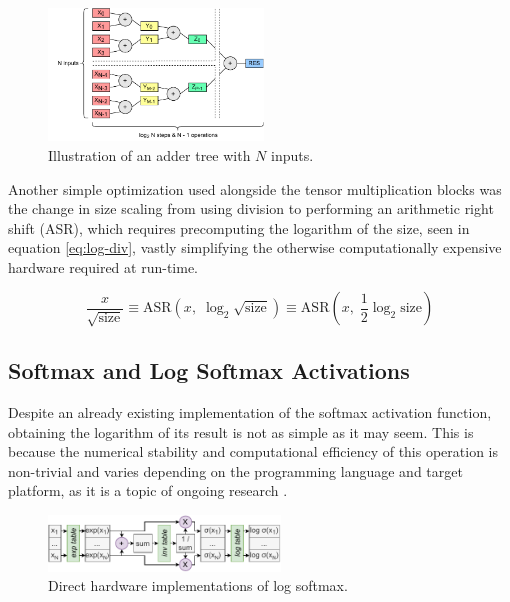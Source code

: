 \begin{figure}[hpt!]
  \centering
  \includegraphics[trim={0cm 0cm 0cm 0cm}, width=0.51\textwidth, center]{quantization/adder_tree.pdf}
  \caption{Illustration of an adder tree with \(N\) inputs.}
  \label{fig:adder-tree}
\end{figure}

Another simple optimization used alongside the tensor multiplication blocks was the change in size scaling from using division to performing an arithmetic right shift (ASR), which requires precomputing the logarithm of the size, seen in equation \ref{eq:log-div}, vastly simplifying the otherwise computationally expensive hardware required at run-time.

\begin{equation}\label{eq:log-div}
  \frac{x}{\sqrt{\text{size}}} \equiv \text{ASR}(x,\; \log_2 \sqrt{\text{size}}) \equiv \text{ASR}(x,\; \frac{1}{2}\log_2 \text{size})
\end{equation}


\subsection{Softmax and Log Softmax Activations}\label{log-softmax}
Despite an already existing \hlsml implementation of the softmax activation function, obtaining the logarithm of its result is not as simple as it may seem. This is because the numerical stability and computational efficiency of this operation is non-trivial and varies depending on the programming language and target platform, as it is a topic of ongoing research \cite{60-blanchard2019accurate}.

\begin{figure}[hpt!]
  \centering
  \includegraphics[trim={0cm 0cm 0cm 0cm}, width=0.55\textwidth, center]{quantization/log_softmax_naive_h.pdf}
  \caption{Direct hardware implementations of log softmax.}
  \label{fig:log-softmax-naive}
\end{figure}

